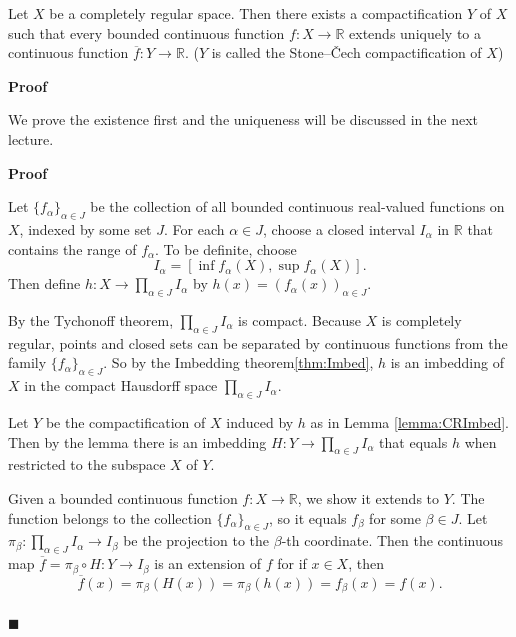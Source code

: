 \documentclass[main.tex]{subfiles}
\begin{document}
\begin{theorem}
    Let $X$ be a completely regular space. Then there exists a compactification $Y$ of $X$ such that every bounded continuous function $f: X \rightarrow \mathbb{R}$ extends uniquely to a continuous function $\overline{f}: Y \rightarrow \mathbb{R}$. ($Y$ is called the Stone–Čech compactification of $X$) 
\end{theorem}
\par \noindent \textbf{Proof} 
\par We prove the existence first and the uniqueness will be discussed in the next lecture. 
\par \noindent \textbf{Proof} 
\par Let $\{f_{\alpha}\}_{\alpha \in J}$ be the collection of all bounded continuous real-valued functions on $X$, indexed by some set $J$. For each $\alpha \in J$, choose a closed interval $I_{\alpha}$ in $\mathbb{R}$ that contains the range of $f_{\alpha}$. To be definite, choose 
\begin{equation}
    I_{\alpha} = [\inf f_{\alpha}(X), \sup f_{\alpha}(X)].
\end{equation}
Then define $h: X \rightarrow \prod_{\alpha \in J} I_{\alpha}$ by $h(x) = (f_{\alpha}(x))_{\alpha \in J}$. 
\par By the Tychonoff theorem, $\prod_{\alpha \in J} I_{\alpha}$ is compact. Because $X$ is completely regular, points and closed sets can be separated by continuous functions from the family $\{f_{\alpha}\}_{\alpha \in J}$. So by the Imbedding theorem\ref{thm:Imbed}, $h$ is an imbedding of $X$ in the compact Hausdorff space $\prod_{\alpha \in J} I_{\alpha}$. 
\par Let $Y$ be the compactification of $X$ induced by $h$ as in Lemma \ref{lemma:CRImbed}. Then by the lemma there is an imbedding $H: Y \rightarrow \prod_{\alpha \in J} I_{\alpha}$ that equals $h$ when restricted to the subspace $X$ of $Y$. 
\par Given a bounded continuous function $f: X \rightarrow \mathbb{R}$, we show it extends to $Y$. The function belongs to the collection $\{f_{\alpha}\}_{\alpha \in J}$, so it equals $f_{\beta}$ for some $\beta \in J$. Let $\pi_{\beta}: \prod_{\alpha \in J} I_{\alpha} \rightarrow I_{\beta}$ be the projection to the $\beta$-th coordinate. Then the continuous map $\overline{f} = \pi_{\beta} \circ H: Y \rightarrow I_{\beta}$ is an extension of $f$ for if $x \in X$, then 
\begin{equation}
    \overline{f}(x) = \pi_{\beta}(H(x)) = \pi_{\beta}(h(x)) = f_{\beta}(x) = f(x). 
\end{equation}
\mbox{} \\ \null \hfill $\blacksquare$ 
\end{document}
